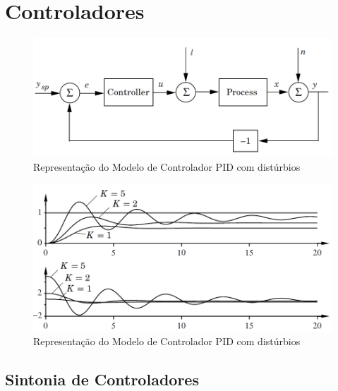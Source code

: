 \section{Controladores}

\begin{figure}[htb]
  \caption{Representação do Modelo de Controlador PID com distúrbios}
  \begin{center}
      \includegraphics[scale=0.65]{img/feedback_loop_astrom_p65}
  \end{center}
\end{figure}

\begin{figure}[htb]
  \caption{Representação do Modelo de Controlador PID com distúrbios}
  \begin{center}
      \includegraphics[scale=0.65]{img/proportional_astrom_p66}
  \end{center}
\end{figure}

\subsection{Sintonia de Controladores}


